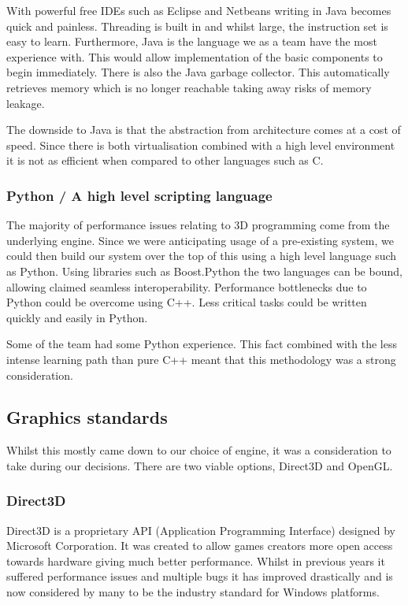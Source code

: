 With powerful free IDEs such as Eclipse and Netbeans
writing in Java becomes quick and painless. Threading is built in
and whilst large, the instruction set is easy to learn. Furthermore, 
Java is the language we as a team have the most experience with. This
would allow implementation of the basic components to begin immediately.
There is also the Java garbage collector. This automatically retrieves
memory which is no longer reachable taking away risks of memory leakage.

The downside to Java is that the abstraction from architecture comes at
a cost of speed. Since there is both virtualisation combined with
a high level environment it is not as efficient when compared to other languages such as C\cite{Jelovic}. 


\subsubsection{Python / A high level scripting language}

The majority of performance issues relating to 3D programming come
from the underlying engine. Since we were anticipating usage of a
pre-existing system, we could then build our system over the top of
this using a high level language such as Python. Using libraries such
as Boost.Python\cite{boostPython} the two languages can be bound,
allowing claimed seamless interoperability. Performance bottlenecks
due to Python could be overcome using C++. Less critical tasks could
be written quickly and easily in Python.

Some of the team had some Python experience. This fact combined with the less intense learning
path than pure C++ meant that this methodology was a strong consideration.


\subsection{Graphics standards}

Whilst this mostly came down to our choice of engine, it was a consideration
to take during our decisions. There are two viable options, Direct3D
and OpenGL.


\subsubsection{Direct3D}

Direct3D is a proprietary API (Application Programming Interface) designed
by Microsoft Corporation. It was created to allow games creators more
open access towards hardware giving much better performance. Whilst
in previous years it suffered performance issues and multiple bugs
it has improved drastically and is now considered by many to be the
industry standard for Windows platforms\cite{Roy2002}.

